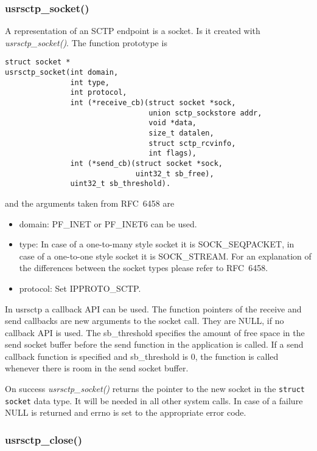 \documentclass[a4paper]{article}
\begin{document}
\subsubsection{usrsctp\_socket()}
A representation of an SCTP endpoint is a socket. Is it created with \textit{usrsctp\_socket()}.
The function prototype is 
\begin{verbatim}
struct socket *
usrsctp_socket(int domain, 
               int type, 
               int protocol,
               int (*receive_cb)(struct socket *sock, 
                                 union sctp_sockstore addr, 
                                 void *data,
                                 size_t datalen, 
                                 struct sctp_rcvinfo, 
                                 int flags),
               int (*send_cb)(struct socket *sock, 
                              uint32_t sb_free),
               uint32_t sb_threshold).
\end{verbatim}
and the arguments taken from RFC~6458 are
\begin{itemize}
\item  domain: PF\_INET or PF\_INET6 can be used.
\item type: In case of a one-to-many style socket it is SOCK\_SEQPACKET, in case of a one-to-one style 
socket it is SOCK\_STREAM. For an explanation of the differences between the socket types please
refer to RFC~6458.
\item protocol: Set IPPROTO\_SCTP.
\end{itemize}

In usrsctp a callback API can be used. The function pointers of the receive and send callbacks
are new arguments to the socket call. They are NULL, if no callback API is used. The sb\_threshold 
specifies the amount of free space in the send socket buffer before the send function in the 
application is called. If a send callback function is specified and sb\_threshold is 0, the function is
called whenever there is room in the send socket buffer.

On success \textit{usrsctp\_socket()} returns the pointer to the new socket in the \texttt{struct socket} data type. 
It will be needed in all other system calls. In case of a failure NULL is returned and
errno is set to the appropriate error code.

\subsubsection{usrsctp\_close()}
\end{document}
